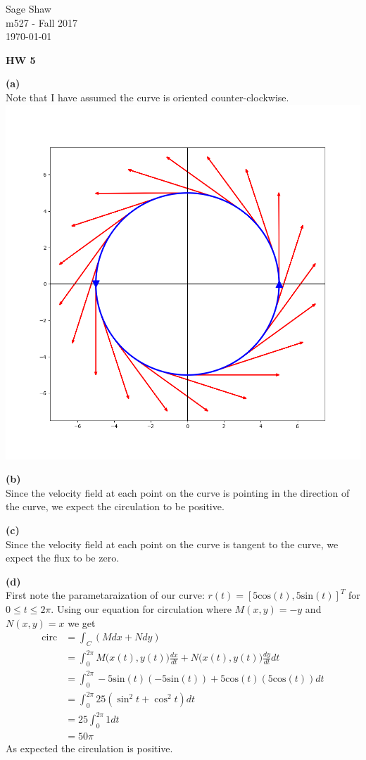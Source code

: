 \documentclass[12pt]{article}
\newcommand{\problem}[1]{\hspace{-4 ex} \large \textbf{#1}\\}
\begin{document}
	\thispagestyle{empty}
	
	\begin{flushright}
		Sage Shaw \\
		m527 - Fall 2017 \\
		\today
	\end{flushright}
	
{\large \textbf{HW 5}}\bigbreak

\problem{(a)}
	Note that I have assumed the curve is oriented counter-clockwise.\\
\includegraphics[width=1.0\textwidth]{hw5_figure_1}
%

\problem{(b)}
	Since the velocity field at each point on the curve is pointing in the direction of the curve, we expect the circulation to be positive.

\problem{(c)}
	Since the velocity field at each point on the curve is tangent to the curve, we expect the flux to be zero.
	
\problem{(d)}
	First note the parametaraization of our curve: $r(t) = [5\text{cos}(t), 5 \text{sin}(t)]^T$ for $0 \leq t \leq 2\pi$.
	Using our equation for circulation where $M(x,y) = -y$ and $N(x,y) = x$ we get
	\begin{align*}
		\text{circ} & = \int_{C}(Mdx + Ndy) \\
		& = \int_{0}^{2\pi} M\big(x(t),y(t)\big)\tfrac{dx}{dt} + N\big(x(t),y(t)\big) \tfrac{dy}{dt} dt \\
		& = \int_{0}^{2\pi} -5 \text{sin}(t)(-5\text{sin}(t)) + 5\text{cos}(t)(5\text{cos}(t)) dt \\
		& = \int_{0}^{2\pi} 25(\sin^2 t+\cos^2 t) dt \\
		& = 25\int_{0}^{2\pi} 1 dt \\
		& = 50\pi
	\end{align*}
	As expected the circulation is positive.\\
	
\end{document}
